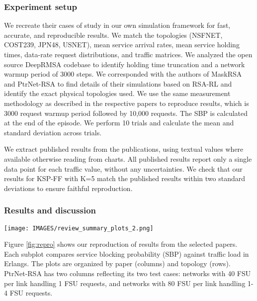 \subsubsection{Experiment setup}


We recreate their cases of study in our own simulation framework \cite{doherty_xlron_2024} for fast, accurate, and reproducible results. We match the topologies (NSFNET, COST239, JPN48, USNET), mean service arrival rates, mean service holding times, data-rate request distributions, and traffic matrices. We analyzed the open source DeepRMSA codebase to identify holding time truncation and a network warmup period of 3000 steps. We corresponded with the authors of MaskRSA and PtrNet-RSA to find details of their simulations based on RSA-RL and identify the exact physical topologies used. We use the same measurement methodology as described in the respective papers to reproduce results, which is 3000 request warmup period followed by 10,000 requests. The SBP is calculated at the end of the episode. We perform 10 trials and calculate the mean and standard deviation across trials.

We extract published results from the publications, using textual values where available otherwise reading from charts. All published results report only a single data point for each traffic value, without any uncertainties. We check that our results for KSP-FF with K=5 match the published results within two standard deviations to ensure faithful reproduction. 



\subsubsection{Results and discussion}


\begin{figure*}
  \texttt{[image: IMAGES/review\_summary\_plots\_2.png]}
  \caption{Mean service blocking probability against traffic load. Each column is a publication and each subplot is for a topology. Error bars and shaded regions show standard deviations. Data for $RL$ and 5-SP-FF$_{published}$ are extracted from the publications. Close agreement between 5-SP-FF$_{published}$ and  5-SP-FF$_{ours}$ show that we accurately reproduce each case of study. \mbox{50-SP-FF$_{hops}$} exceeds or  matches the $RL$ performance for each case.}
  \label{fig:repro}
\end{figure*}

Figure \ref{fig:repro} shows our reproduction of results from the selected papers. Each subplot compares service blocking probability (SBP) against traffic load in Erlangs. The plots are organized by paper (columns) and topology (rows). PtrNet-RSA has two columns reflecting its two test cases: networks with 40 FSU per link handling 1 FSU requests, and networks with 80 FSU per link handling 1-4 FSU requests.

